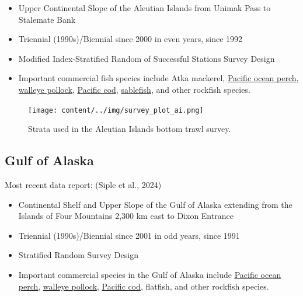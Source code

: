 \documentclass[
  letterpaper,
  oneside,
  open=any]{scrbook}
\providecommand{\tightlist}{%
  \setlength{\itemsep}{0pt}\setlength{\parskip}{0pt}}\usepackage{longtable,booktabs,array}
\begin{document}
\begin{itemize}
\tightlist
\item
  Upper Continental Slope of the Aleutian Islands from Unimak Pass to
  Stalemate Bank
\item
  Triennial (1990s)/Biennial since 2000 in even years, since 1992
\item
  Modified Index-Stratified Random of Successful Stations Survey Design
\item
  Important commercial fish species include Atka mackerel,
  \href{https://www.fisheries.noaa.gov/species/pacific-ocean-perch}{Pacific
  ocean perch},
  \href{https://www.fisheries.noaa.gov/species/alaska-pollock}{walleye
  pollock},
  \href{https://www.fisheries.noaa.gov/species/pacific-cod}{Pacific
  cod},
  \href{https://www.fisheries.noaa.gov/species/sablefish}{sablefish},
  and other rockfish species.
\end{itemize}

\begin{figure}[H]

{\centering \texttt{[image: content/../img/survey\_plot\_ai.png]}

}

\caption{Strata used in the Aleutian Islands bottom trawl survey.}

\end{figure}%

\subsection{\texorpdfstring{\textbf{Gulf of
Alaska}}{Gulf of Alaska}}\label{gulf-of-alaska}

Most recent data report: (Siple et al., 2024)

\begin{itemize}
\tightlist
\item
  Continental Shelf and Upper Slope of the Gulf of Alaska extending from
  the Islands of Four Mountains 2,300 km east to Dixon Entrance
\item
  Triennial (1990s)/Biennial since 2001 in odd years, since 1991
\item
  Stratified Random Survey Design
\item
  Important commercial species in the Gulf of Alaska include
  \href{https://www.fisheries.noaa.gov/species/pacific-ocean-perch}{Pacific
  ocean perch},
  \href{https://www.fisheries.noaa.gov/species/alaska-pollock}{walleye
  pollock},
  \href{https://www.fisheries.noaa.gov/species/pacific-cod}{Pacific
  cod}, flatfish, and other rockfish species.
\end{itemize}
\end{document}
